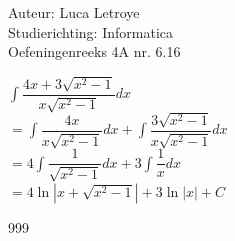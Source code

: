 \documentclass[a4paper]{article}
\begin{document}
  
\noindent \large Auteur: Luca Letroye \\
\noindent \large Studierichting: Informatica\\
\noindent \large Oefeningenreeks 4A nr. 6.16\\

\medskip
\normalsize

$\displaystyle\int \dfrac{4x+3\sqrt{x^2-1}}{x\sqrt{x^2-1}}dx$\\

$ = \displaystyle\int \dfrac{4x}{x\sqrt{x^2-1}}dx + \displaystyle\int \dfrac{3\sqrt{x^2-1}}{x\sqrt{x^2-1}}dx$\\

$ = 4\displaystyle\int \dfrac{1}{\sqrt{x^2-1}}dx + 3\displaystyle\int \dfrac{1}{x}dx$\\

$ = 4\ln|x+\sqrt{x^2-1}| + 3\ln|x|+C$\\




\begin{thebibliography}{999}
\end{thebibliography}
\end{document}
